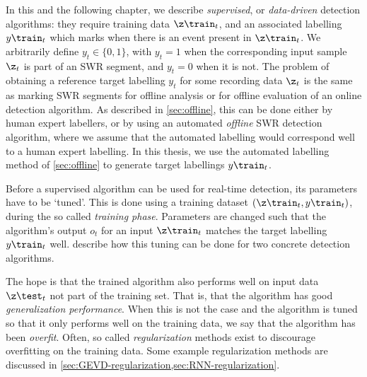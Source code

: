 \label{sec:data-driven-algorithms}

In this and the following chapter, we describe \emph{supervised}, or \emph{data-driven} detection algorithms: they require training data $\z\train_t$, and an associated labelling $y\train_t$ which marks when there is an event present in $\z\train_t$. We arbitrarily define $y_t \in \{0, 1\}$, with $y_t = 1$ when the corresponding input sample $\z_t$ is part of an SWR segment, and $y_t = 0$ when it is not. The problem of obtaining a reference target labelling $y_t$ for some recording data $\z_t$ is the same as marking SWR segments for offline analysis or for offline evaluation of an online detection algorithm. As described in \cref{sec:offline}, this can be done either by human expert labellers, or by using an automated \emph{offline} SWR detection algorithm, where we assume that the automated labelling would correspond well to a human expert labelling. In this thesis, we use the automated labelling method of \cref{sec:offline} to generate target labellings $y\train_t$.

Before a supervised algorithm can be used for real-time detection, its parameters have to be `tuned'. This is done using a training dataset $(\z\train_t, y\train_t)$, during the so called \emph{training phase}. Parameters are changed such that the algorithm's output $o_t$ for an input $\z\train_t$ matches the target labelling $y\train_t$ well.  describe how this tuning can be done for two concrete detection algorithms.

The hope is that the trained algorithm also performs well on input data $\z\test_t$ not part of the training set. That is, that the algorithm has good \emph{generalization performance}. When this is not the case and the algorithm is tuned so that it only performs well on the training data, we say that the algorithm has been \emph{overfit}. Often, so called \emph{regularization} methods exist to discourage overfitting on the training data. Some example regularization methods are discussed in \cref{sec:GEVD-regularization,sec:RNN-regularization}.
